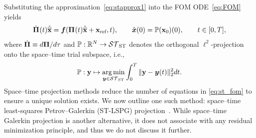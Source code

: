 \documentclass[3p,computermodern,10pt]{elsarticle}
\begin{document}
Substituting the approximation~\eqref{eq:stapprox1} into the FOM
ODE~\eqref{eq:FOM} yields
\begin{equation}\label{eq:st_fom}
\dot{\boldsymbol \Pi}^{}(t) \hat{\mathbf{\overline{x}}} =  \boldsymbol f(\boldsymbol \Pi^{}(t) \hat{\mathbf{\overline{x}}} +
	\mathbf{x}_\text{ref},t) , \qquad \hat{ \boldsymbol x}(0) =\mathbb{P}({{\mathbf{x}}_0})(0), \qquad t \in [0,T],
\end{equation}
where 
$\dot{\boldsymbol \Pi}\equiv d\boldsymbol \Pi/d\tau$ and
$\mathbb{P} : \mathbb{R}^{N} \rightarrow \mathcal{ ST }_{\text{ST}}$ denotes the
orthogonal $\ell^2$-projection onto the space--time trial subspace, i.e.,
$$
\mathbb{P}:\mathbf{y}\mapsto\underset{\boldsymbol y\in\mathcal{ ST }_{\text{ST}}}{\text{arg\,min}}\int_0^T\|\mathbf{y}
- \boldsymbol y( t)\|_2^2d t.
$$
Space--time projection methods reduce the number of equations in
\eqref{eq:st_fom} to ensure a unique solution exists.
We now outline one such method: space--time least-squares Petrov--Galerkin (ST-LSPG)
projection~\cite{choi_stlspg}. 
While space--time Galerkin projection  is another alternative, it does not
associate with any residual minimization principle, and thus we do not discuss
it further.
\end{document}
